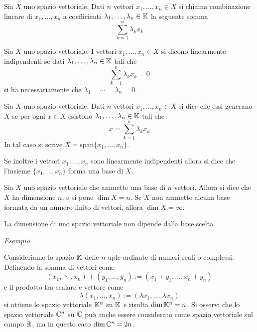 \begin{defn}
Sia $X$ uno spazio vettoriale. Dati $n$ vettori $x_1,\dots,x_n\in X$ si chiama combinazione lineare di $x_1,\dots,x_n$ a coefficienti $\lambda_1,\dots,\lambda_n\in\mathbb{K}$ la seguente somma
\begin{equation*}
\sum_{k=1}^n \lambda_kx_k
\end{equation*}
\end{defn}

\begin{defn}
Sia $X$ uno spazio vettoriale. I vettori $x_1,\dots,x_n\in X$ si dicono linearmente indipendenti se dati $\lambda_1,\dots,\lambda_n\in\mathbb{K}$ tali che
\begin{equation*}
\sum_{k=1}^n \lambda_kx_k=0
\end{equation*}
si ha necessariamente che $\lambda_1=\cdots=\lambda_n=0$.
\end{defn}

\begin{defn}
Sia $X$ uno spazio vettoriale. Dati $n$ vettori $x_1,\dots,x_n\in X$ si dice che essi generano $X$ se per ogni $x\in X$ esistono $\lambda_1,\dots,\lambda_n\in\mathbb{K}$ tali che
\begin{equation*}
x=\sum_{k=1}^n \lambda_kx_k
\end{equation*}
In tal caso si scrive $X=\text{span}\{x_1,\dots,x_n\}$. 

Se inoltre i vettori $x_1,\dots,x_n$ sono linearmente indipendenti allora si dice che l'insieme $\{x_1,\dots,x_n\}$ forma una base di $X$.
\end{defn}

\begin{defn}[Dimensione]
Sia $X$ uno spazio vettoriale che ammette una base di $n$ vettori. Allora si dice che $X$ ha dimensione $n$, e si pone $\dim X=n$. Se $X$ non ammette alcuna base formata da un numero finito di vettori, allora $\dim X=\infty$.
\end{defn}

\begin{thm}
La dimensione di uno spazio vettoriale non dipende dalla base scelta.
\end{thm}

\textit{Esempio.}

Consideriamo lo spazio $\mathbb{K}$ delle $n$-uple ordinate di numeri reali o complessi. Definendo la somma di vettori come
$$
(x_1,\ddots,x_n)+(y_1,\dots,y_n):=(x_1+y_1,\dots,x_n+y_n)
$$
e il prodotto tra scalare e vettore come
$$
\lambda(x_1,\dots,x_n):=(\lambda x_1,\dots, \lambda x_n)
$$
si ottiene lo spazio vettoriale $\mathbb{K}^n$ su $\mathbb{K}$ e risulta $\dim \mathbb{K}^n=n$. Si osservi che lo spazio vettoriale $\mathbb{C}^n$ su $\mathbb{C}$ può anche essere considerato come spazio vettoriale sul campo $\mathbb{R}$, ma in questo caso $\dim \mathbb{C}^n=2n$. 

